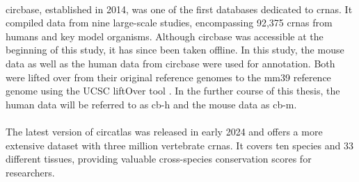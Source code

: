 \paragraph{} \gls{circbase}, established in 2014, was one
of the first databases dedicated to \glspl{crna}.
It compiled data from nine large-scale studies, encompassing 92,375
\glspl{crna} from humans and key model
organisms\supercite{glazar_circbase_2014}.
Although \gls{circbase} was accessible at the beginning of this study, it has
since been taken offline.
In this study, the mouse data as well as the human data from \gls{circbase}
were used for annotation.
Both were lifted over from their original reference genomes to the mm39
reference genome using the UCSC liftOver tool \supercite{hinrichs_ucsc_2006}.
In the further course of this thesis, the human data will be referred to as
\gls{cb-h} and the mouse data as \gls{cb-m}.

\paragraph{}
The latest version of \gls{circatlas} was released in early 2024 and offers a
more extensive dataset with three million vertebrate \glspl{crna}.
It covers ten species and 33 different tissues, providing valuable
cross-species conservation scores for researchers\supercite{wu_circatlas_2023}.
